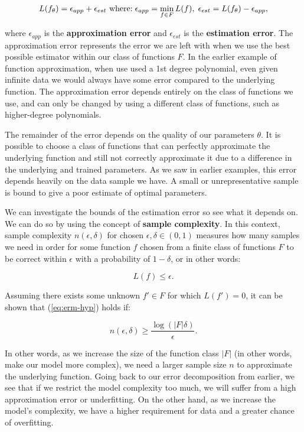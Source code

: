 \begin{equation}
	L(f_\theta) = \epsilon_{app} + \epsilon_{est}
	\text{ where:\;}  \epsilon_{app} = \min_{f \in F}L(f),\;
	\epsilon_{est} = L(f_\theta) - \epsilon_{app},
\end{equation}

where $\epsilon_{app}$ is the \textbf{approximation error} and $\epsilon_{est}$ is the \textbf{estimation error}. The approximation error represents the error we are left with when we use the best possible estimator within our class of functions $F$. In the earlier example of function approximation, when use used a 1st degree polynomial, even given infinite data we would always have some error compared to the underlying function. The approximation error depends entirely on the class of functions we use, and can only be changed by using a different class of functions, such as higher-degree polynomials.

The remainder of the error depends on the quality of our parameters $\theta$. It is possible to choose a class of functions that can perfectly approximate the underlying function and still not correctly approximate it due to a difference in the underlying and trained parameters. As we saw in earlier examples, this error depends heavily on the data sample we have. A small or unrepresentative sample is bound to give a poor estimate of optimal parameters.

We can investigate the bounds of the estimation error so see what it depends on. We can do so by using the concept of \textbf{sample complexity}. In this context, sample complexity $n(\epsilon, \delta)$ for chosen $\epsilon, \delta \in (0, 1)$ measures how many samples we need in order for some function $f$ chosen from a finite class of functions $F$ to be correct within $\epsilon$ with a probability of $1 - \delta$, or in other words:

\begin{equation}
	L(f) \leq \epsilon.
	\label{eq:erm-hyp}
\end{equation}

Assuming there exists some unknown $f' \in F$ for which $L(f') = 0$, it can be shown  that (\ref{eq:erm-hyp}) holds if:

\begin{equation}
	n(\epsilon, \delta) \geq \frac{\log(\lvert F \rvert \delta)}{\epsilon}.
\end{equation}

In other words, as we increase the size of the function class $|F|$ (in other words, make our model more complex), we need a larger sample size $n$ to approximate the underlying function. Going back to our error decomposition from earlier, we see that if we restrict the model complexity too much, we will suffer from a high approximation error or underfitting. On the other hand, as we increase the model's complexity, we have a higher requirement for data and a greater chance of overfitting. 

